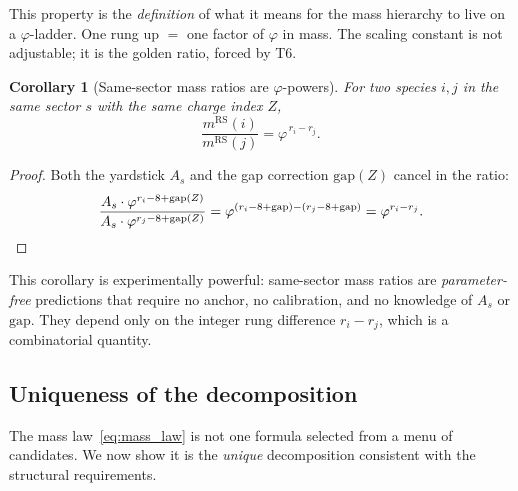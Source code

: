 \documentclass[11pt,a4paper]{article}
\newtheorem{corollary}[theorem]{Corollary}
\theoremstyle{definition}
\theoremstyle{remark}
\newcommand{\phig}{\varphi}
\newcommand{\mRS}{m^{\mathrm{RS}}}
\newcommand{\Zidx}{Z}
\begin{document}
\noindent
This property is the \emph{definition} of what it means for the mass hierarchy
to live on a $\phig$-ladder.  One rung up $= $ one factor of $\phig$ in mass.
The scaling constant is not adjustable; it is the golden ratio, forced by T6.

\begin{corollary}[Same-sector mass ratios are $\phig$-powers]
\label{cor:same_sector_ratios}
For two species $i, j$ in the same sector $s$ with the same charge index
$\Zidx$,
\begin{equation}
  \frac{\mRS(i)}{\mRS(j)}
  = \phig^{\,r_i - r_j}.
  \label{eq:mass_ratio}
\end{equation}
\end{corollary}

\begin{proof}
Both the yardstick $A_s$ and the gap correction $\mathrm{gap}(\Zidx)$ cancel
in the ratio:
\[
  \frac{A_s \cdot \phig^{r_i - 8 + \mathrm{gap}(\Zidx)}}
       {A_s \cdot \phig^{r_j - 8 + \mathrm{gap}(\Zidx)}}
  = \phig^{(r_i - 8 + \mathrm{gap}) - (r_j - 8 + \mathrm{gap})}
  = \phig^{r_i - r_j}. \qedhere
\]
\end{proof}

\noindent
This corollary is experimentally powerful: same-sector mass ratios are
\emph{parameter-free} predictions that require no anchor, no calibration,
and no knowledge of $A_s$ or $\mathrm{gap}$.  They depend only on the
integer rung difference $r_i - r_j$, which is a combinatorial quantity.

\subsection{Uniqueness of the decomposition}

The mass law~\eqref{eq:mass_law} is not one formula selected from a menu
of candidates.  We now show it is the \emph{unique} decomposition consistent
with the structural requirements.
\end{document}
